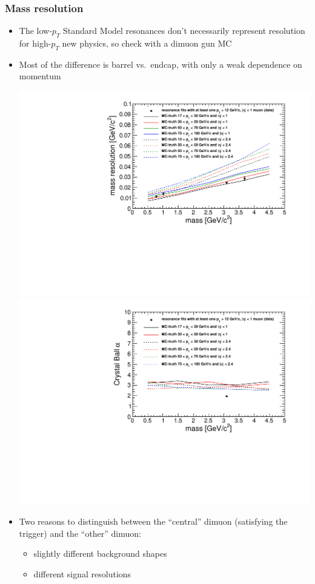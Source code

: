 \documentclass[compress]{beamer}
\begin{document}
\begin{frame}
\frametitle{Mass resolution}

\begin{itemize}
\item The low-$p_T$ Standard Model resonances don't necessarily
  represent resolution for high-$p_T$ new physics, so check with a
  dimuon gun MC

\item Most of the difference is barrel vs.\ endcap, with only a weak
  dependence on momentum

\includegraphics[width=0.5\linewidth]{resolution.pdf}
\includegraphics[width=0.5\linewidth]{resolution_alpha.pdf}

\item Two reasons to distinguish between the ``central'' dimuon
  (satisfying the trigger) and the ``other'' dimuon:
\begin{itemize}
\item slightly different background shapes
\item different signal resolutions
\end{itemize}
\end{itemize}
\end{frame}

\end{document}
